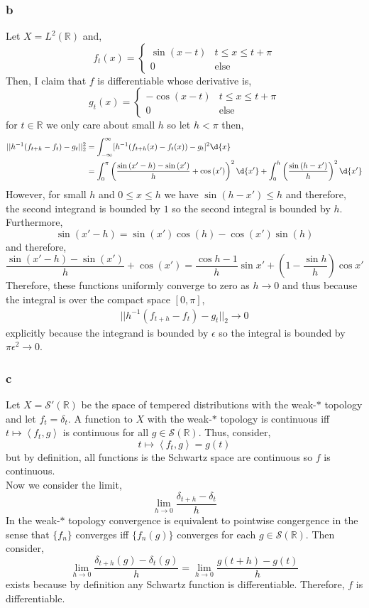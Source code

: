 \documentclass[12pt]{article}
\newcommand{\inner}[2]{\left< #1, #2 \right>}
\newcommand{\R}{\mathbb{R}}
\begin{document}
\subsubsection{b}

Let $X = L^2(\R)$ and,
\[ f_t(x) = 
\begin{cases}
\sin{(x - t)} & t \le x \le t + \pi
\\
0 & \text{else} 
\end{cases} \]
Then, I claim that $f$ is differentiable whose derivative is,
\[ g_t(x) = \begin{cases}
-\cos{(x - t)} & t \le x \le t + \pi
\\
0 & \text{else} 
\end{cases} \]
for $t \in \R$ we only care about small $h$ so let $h < \pi$ then,
\begin{align*}
|| h^{-1}(f_{t+h} - f_t) - g_t ||_2^2 & = \int_{-\infty}^{\infty} [h^{-1}(f_{t+h}(x) - f_{t}(x)) - g_t]^2 \d{x} 
\\
& = \int_{0}^{\pi} \left( \frac{\sin{(x' - h)} - \sin{(x')}}{h} + \cos{(x')} \right)^2 \d{x'} + \int_0^h \left( \frac{\sin{(h - x')}}{h} \right)^2 \d{x'} 
\end{align*}
However, for small $h$ and $0 \le x \le h$ we have $\sin{(h - x')} \le h$ and therefore, the second integrand is bounded by $1$ so the second integral is bounded by $h$. Furthermore, \[ \sin{(x' - h)} = \sin{(x')} \cos{(h)} - \cos{(x')} \sin{(h)} \]
and therefore,
\[ \frac{\sin{(x' - h)} - \sin{(x')}}{h} + \cos{(x')} = \frac{\cos{h} - 1}{h} \sin{x'} + \left( 1 - \frac{\sin{h}}{h} \right) \cos{x'} \]
Therefore, these functions uniformly converge to zero as $h \to 0$ and thus because the integral is over the compact space $[0, \pi]$,
\begin{align*}
|| h^{-1}(f_{t+h} - f_t) - g_t ||_2 \to 0 
\end{align*}
explicitly because the integrand is bounded by $\epsilon$ so the integral is bounded by $\pi \epsilon^2 \to 0$.

\subsubsection{c}

Let $X = \mathcal{S}'(\R)$ be the space of tempered distributions with the weak-$*$ topology and let $f_t = \delta_t$. A function to $X$ with the weak-$*$ topology is continuous iff $t \mapsto \inner{f_t}{g}$ is continuous for all $g \in \mathcal{S}(\R)$. Thus, consider,
\[ t \mapsto \inner{f_t}{g} = g(t) \]
but by definition, all functions is the Schwartz space are continuous so $f$ is continuous.
\bigskip\\
Now we consider the limit,
\[ \lim_{h \to 0} \frac{\delta_{t + h} - \delta_t}{h} \]
In the weak-$*$ topology convergence is equivalent to pointwise congergence in the sense that $\{ f_n \}$ converges iff $\{ f_n(g) \}$ converges for each $g \in \mathcal{S}(\R)$. Then consider,
\[ \lim_{h \to 0} \frac{\delta_{t + h}(g) - \delta_t(g)}{h} = \lim_{h \to 0} \frac{g(t + h) - g(t)}{h} \]
exists because by definition any Schwartz function is differentiable. Therefore, $f$ is differentiable.
\end{document}
